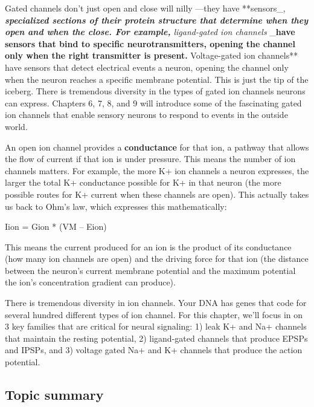 \documentclass[
]{book}
\begin{document}
Gated channels don't just open and close will nilly ---they have **sensors\_, \emph{\textbf{specialized sections of their protein structure that determine when they open and when the close. For example, }ligand-gated ion channels} \_\textbf{have sensors that bind to specific neurotransmitters, opening the channel only when the right transmitter is present. }Voltage-gated ion channels** have sensors that detect electrical events a neuron, opening the channel only when the neuron reaches a specific membrane potential. This is just the tip of the iceberg. There is tremendous diversity in the types of gated ion channels neurons can express. Chapters 6, 7, 8, and 9 will introduce some of the fascinating gated ion channels that enable sensory neurons to respond to events in the outside world.

An open ion channel provides a \textbf{conductance} for that ion, a pathway that allows the flow of current if that ion is under pressure. This means the number of ion channels matters. For example, the more K+ ion channels a neuron expresses, the larger the total K+ conductance possible for K+ in that neuron (the more possible routes for K+ current when these channels are open). This actually takes us back to Ohm's law, which expresses this mathematically:

Iion = Gion * (VM -- Eion)

This means the current produced for an ion is the product of its conductance (how many ion channels are open) and the driving force for that ion (the distance between the neuron's current membrane potential and the maximum potential the ion's concentration gradient can produce).

There is tremendous diversity in ion channels. Your DNA has genes that code for several hundred different types of ion channel. For this chapter, we'll focus in on 3 key families that are critical for neural signaling: 1) leak K+ and Na+ channels that maintain the resting potential, 2) ligand-gated channels that produce EPSPs and IPSPs, and 3) voltage gated Na+ and K+ channels that produce the action potential.

\hypertarget{topic-summary-2}{%
\subsection{Topic summary}\label{topic-summary-2}}
\end{document}

